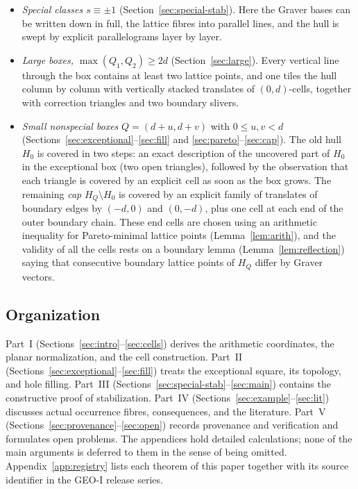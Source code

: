 \begin{itemize}
\item \emph{Special classes $s\equiv\pm1$} (Section~\ref{sec:special-stab}). Here the Graver bases can be written down in full, the lattice fibres into parallel lines, and the hull is swept by explicit parallelograms layer by layer.
\item \emph{Large boxes, $\max(Q_1,Q_2)\ge2d$} (Section~\ref{sec:large}). Every vertical line through the box contains at least two lattice points, and one tiles the hull column by column with vertically stacked translates of $(0,d)$-cells, together with correction triangles and two boundary slivers.
\item \emph{Small nonspecial boxes} $Q=(d+u,d+v)$ with $0\le u,v<d$ (Sections~\ref{sec:exceptional}--\ref{sec:fill} and \ref{sec:pareto}--\ref{sec:cap}). The old hull $H_0$ is covered in two steps: an exact description of the uncovered part of $H_0$ in the exceptional box (two open triangles), followed by the observation that each triangle is covered by an explicit cell as soon as the box grows. The remaining \emph{cap} $H_Q\setminus H_0$ is covered by an explicit family of translates of boundary edges by $(-d,0)$ and $(0,-d)$, plus one cell at each end of the outer boundary chain. These end cells are chosen using an arithmetic inequality for Pareto-minimal lattice points (Lemma~\ref{lem:arith}), and the validity of all the cells rests on a boundary lemma (Lemma~\ref{lem:reflection}) saying that consecutive boundary lattice points of $H_Q$ differ by Graver vectors.
\end{itemize}

\subsection{Organization}

Part~I (Sections~\ref{sec:intro}--\ref{sec:cells}) derives the arithmetic coordinates, the planar normalization, and the cell construction. Part~II (Sections~\ref{sec:exceptional}--\ref{sec:fill}) treats the exceptional square, its topology, and hole filling. Part~III (Sections~\ref{sec:special-stab}--\ref{sec:main}) contains the constructive proof of stabilization. Part~IV (Sections~\ref{sec:example}--\ref{sec:lit}) discusses actual occurrence fibres, consequences, and the literature. Part~V (Sections~\ref{sec:provenance}--\ref{sec:open}) records provenance and verification and formulates open problems. The appendices hold detailed calculations; none of the main arguments is deferred to them in the sense of being omitted. Appendix~\ref{app:registry} lists each theorem of this paper together with its source identifier in the GEO-I release series.

